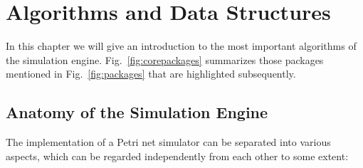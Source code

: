 \chapter{Algorithms and Data Structures}

In this chapter we will give an introduction to the
most important algorithms of the simulation engine.
Fig.~\ref{fig:corepackages} summarizes those packages
mentioned in Fig.~\ref{fig:packages} that are
highlighted subsequently.



\section{Anatomy of the Simulation Engine}

The implementation of a Petri net simulator can be separated into various 
aspects, which can be regarded independently 
from each other to some extent: 

